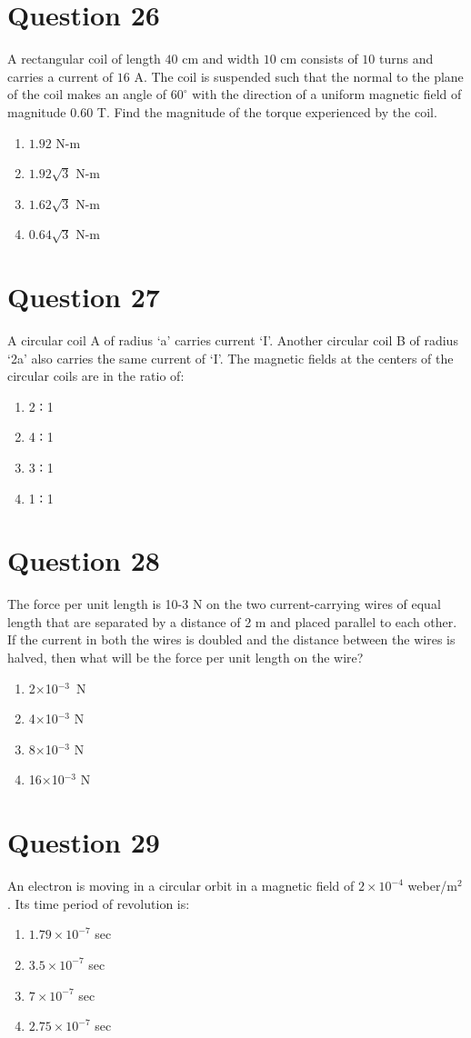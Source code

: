 \documentclass{article}
\begin{document}
\section*{Question 26}
A rectangular coil of length \(40\) cm and width \(10\) cm consists of \(10\) turns and carries a current of \(16\) A. The coil is suspended such that the normal to the plane of the coil makes an angle of \(60^{\circ}\) with the direction of a uniform magnetic field of magnitude \(0.60\) T. Find the magnitude of the torque experienced by the coil.
\begin{enumerate}[label=(\alph*)]
\item \(1.92\) N-m
\item \(1.92 \sqrt{3}\) N-m
\item \(1.62 \sqrt{3}\) N-m
\item \(0.64 \sqrt{3}\) N-m
\end{enumerate}
\newpage
\section*{Question 27}
A circular coil A of radius ‘a’ carries current ‘I’. Another circular coil B of radius ‘2a’ also carries the same current of ‘I’. The magnetic fields at the centers of the circular coils are in the ratio of:
\begin{enumerate}[label=(\alph*)]
\item 2 ∶ 1
\item 4 ∶ 1
\item 3 ∶ 1
\item 1 ∶ 1
\end{enumerate}
\newpage
\section*{Question 28}
The force per unit length is 10-3 N on the two current-carrying wires of equal length that are separated by a distance of 2 m and placed parallel to each other. If the current in both the wires is doubled and the distance between the wires is halved, then what will be the force per unit length on the wire?
\begin{enumerate}[label=(\alph*)]
\item 2×10$^{-3}$ N
\item 4×10$^{-3}$ N
\item 8×10$^{-3}$ N
\item 16×10$^{-3}$ N
\end{enumerate}
\newpage
\section*{Question 29}
An electron is moving in a circular orbit in a magnetic field of \(2 \times 10^{-4}\) weber/m\(^{2}\). Its time period of revolution is:
\begin{enumerate}[label=(\alph*)]
\item \(1.79 \times 10^{-7}\) sec
\item \(3.5 \times 10^{-7}\) sec
\item \(7 \times 10^{-7}\) sec
\item \(2.75 \times 10^{-7}\) sec
\end{enumerate}
\newpage
\end{document}

